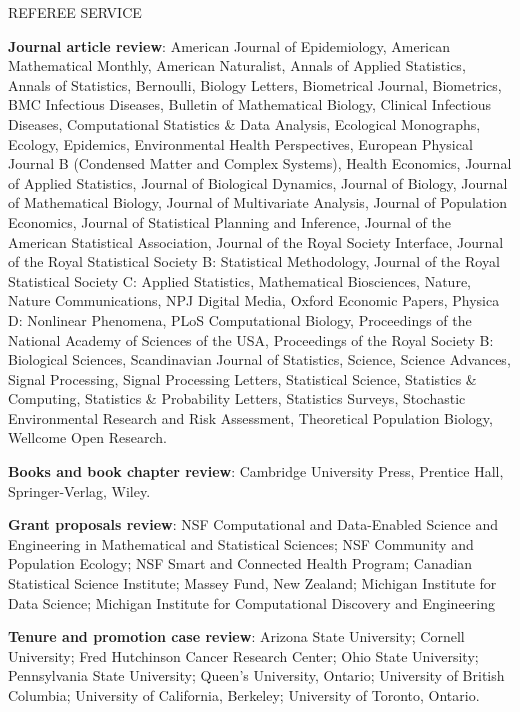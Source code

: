 \begin{mylist}{REFEREE SERVICE} %
\item {\bf Journal article review}: 
American Journal of Epidemiology,
American Mathematical Monthly,
American Naturalist,
Annals of Applied Statistics,
Annals of Statistics,
Bernoulli,
Biology Letters,
Biometrical Journal,
Biometrics,
BMC Infectious Diseases,
Bulletin of Mathematical Biology,
Clinical Infectious Diseases,
Computational Statistics \& Data Analysis,
Ecological Monographs,
Ecology,
Epidemics,
Environmental Health Perspectives,
European Physical Journal B (Condensed Matter and Complex Systems),
Health Economics,
Journal of Applied Statistics,
Journal of Biological Dynamics,
Journal of Biology,
Journal of Mathematical Biology,
Journal of Multivariate Analysis,
Journal of Population Economics,
Journal of Statistical Planning and Inference,
Journal of the American Statistical Association, 
Journal of the Royal Society Interface,  
Journal of the Royal Statistical Society B: Statistical Methodology,
Journal of the Royal Statistical Society C: Applied Statistics,
Mathematical Biosciences,
Nature,
Nature Communications,
NPJ Digital Media,
Oxford Economic Papers,
Physica D: Nonlinear Phenomena,
PLoS Computational Biology,
Proceedings of the National Academy of Sciences of the USA,
Proceedings of the Royal Society B: Biological Sciences,
Scandinavian Journal of Statistics,
Science,
Science Advances,
Signal Processing,
Signal Processing Letters,
Statistical Science,
Statistics \& Computing,
Statistics \& Probability Letters,
Statistics Surveys,
Stochastic Environmental Research and Risk Assessment,
Theoretical Population Biology,
Wellcome Open Research.

\item {\bf Books and book chapter review}:
Cambridge University Press, 
Prentice Hall,
 Springer-Verlag,  
 Wiley.

\item {\bf Grant proposals review}: 
NSF Computational and Data-Enabled Science and Engineering in Mathematical and Statistical Sciences;
NSF Community and Population Ecology;
NSF Smart and Connected Health Program;
Canadian Statistical Science Institute;
Massey Fund, New Zealand;
Michigan Institute for Data Science;
Michigan Institute for Computational Discovery and Engineering

\item {\bf Tenure and promotion case review}:
Arizona State University;
Cornell University;
Fred Hutchinson Cancer Research Center;
Ohio State University;
Pennsylvania State University;
Queen's University, Ontario;
University of British Columbia;
University of California, Berkeley;
University of Toronto, Ontario.

\end{mylist}

